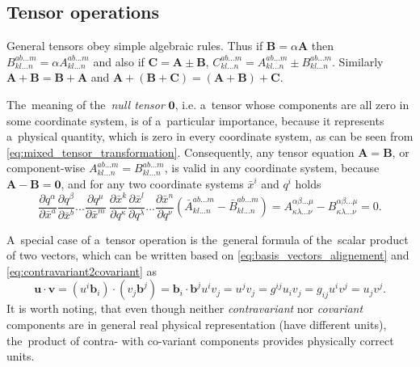 \documentclass[review]{elsarticle}
\newcommand{\pdv}[2]{\frac{\partial{#1}}{\partial{#2}}}
\newcommand{\vect}[1]{\boldsymbol{#1}}
\newcommand{\matr}[1]{\mathbf{#1}}
\begin{document}
\subsection{Tensor operations} 
General tensors obey simple algebraic rules. Thus if 
$\matr{B} = \alpha \matr{A}$ then 
$B^{ab...m}_{kl...n} = \alpha A^{ab...m}_{kl...n}$ and also if
$\matr{C} = \matr{A}\pm\matr{B}$, 
$C^{ab...m}_{kl...n} = A^{ab...m}_{kl...n} \pm B^{ab...m}_{kl...n}$.
Similarly $\matr{A} + \matr{B} = \matr{B} + \matr{A}$ and
$\matr{A} + (\matr{B} + \matr{C}) = (\matr{A} + \matr{B}) + \matr{C}$.

The~meaning of the~\textit{null tensor} $\matr{0}$, i.e. a~tensor whose 
components are all zero in some coordinate system, 
is of a~particular importance,
because it represents a~physical quantity, which is zero in every coordinate
system, as can be seen from  \eqref{eq:mixed_tensor_transformation}.
Consequently, any tensor equation $\matr{A} = \matr{B}$, or component-wise
$A^{ab...m}_{kl...n} = B^{ab...m}_{kl...n}$, is valid in any coordinate system,
because $\matr{A} - \matr{B} = \matr{0}$, and for any two coordinate systems
$\bar{x}^i$ and $q^i$ holds
\begin{equation} 
  \pdv{q^\alpha}{\bar{x}^a} \pdv{q^\beta}{\bar{x}^b} ...
  \pdv{q^\mu}{\bar{x}^m}~
  \pdv{\bar{x}^k}{q^\kappa} \pdv{\bar{x}^l}{q^\lambda} ...
  \pdv{\bar{x}^n}{q^\nu} 
  (\bar{A}^{ab...m}_{kl...n} - \bar{B}^{ab...m}_{kl...n})
  = A^{\alpha\beta...\mu}_{\kappa\lambda...\nu} 
  - B^{\alpha\beta...\mu}_{\kappa\lambda...\nu} = 0 .
  \label{eq:tensor_equation}
\end{equation}

A~special case of a~tensor operation is the~general formula of the~scalar 
product of two vectors, which can be written based
on \eqref{eq:basis_vectors_alignement} and \eqref{eq:contravariant2covariant} as
\begin{equation}
  \vect{u}\cdot\vect{v} = (u^i \vect{b}_i)\cdot(v_j \vect{b}^j) 
  = \vect{b}_i\cdot\vect{b}^j u^i v_j = u^j v_j = g^{ij} u_i v_j = 
  g_{ij} u^i v^j = u_j v^j .
  \label{eq:general_scalar_product}
\end{equation} 
It is worth noting, that even though neither 
\textit{contravariant} nor \textit{covariant} components are in general
real physical representation (have different units), the~product of 
contra- with co-variant components provides physically correct units.
\end{document}
